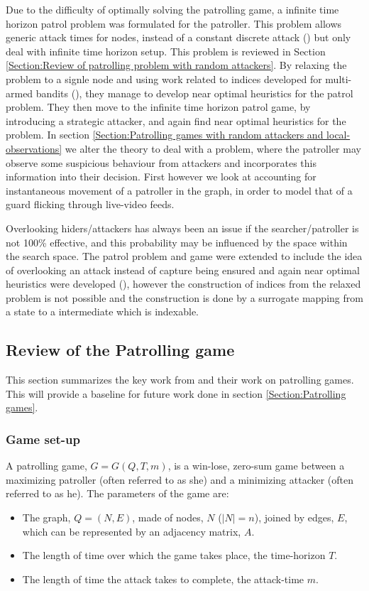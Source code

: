 \documentclass[a4paper,10pt]{article}
\theoremstyle{definition}
\theoremstyle{definition}
\theoremstyle{remark}
\theoremstyle{definition}
\begin{document}
Due to the difficulty of optimally solving the patrolling game, a infinite time horizon patrol problem was formulated for the patroller. This problem allows generic attack times for nodes, instead of a constant discrete attack (\citep{Lin2013}) but only deal with infinite time horizon setup. This problem is reviewed in Section \ref{Section:Review of patrolling problem with random attackers}. By relaxing the problem to a signle node and using work related to indices developed for multi-armed bandits (\cite{Gittins2011}), they manage to develop near optimal heuristics for the patrol problem. They then move to the infinite time horizon patrol game, by introducing a strategic attacker, and again find near optimal heuristics for the problem. In section \ref{Section:Patrolling games with random attackers and local-observations} we alter the theory to deal with a problem, where the patroller may observe some suspicious behaviour from attackers and incorporates this information into their decision. First however we look at accounting for instantaneous movement of a patroller in the graph, in order to model that of a guard flicking through live-video feeds.

Overlooking hiders/attackers has always been an issue if the searcher/patroller is not 100\% effective, and this probability may be influenced by the space within the search space. The patrol problem and game were extended to include the idea of overlooking an attack instead of capture being ensured and again near optimal heuristics were developed (\cite{Lin2014}), however the construction of indices from the relaxed problem is not possible and the construction is done by a surrogate mapping from a state to a intermediate which is indexable.

\subsection{Review of the Patrolling game}
\label{Section:Review of Strategic Patrolling games}
This section summarizes the key work from \cite{Alpern2011} and their work on patrolling games. This will provide a baseline for future work done in section \ref{Section:Patrolling games}.

\subsubsection{Game set-up}
A patrolling game, $G=G(Q,T,m)$, is a win-lose, zero-sum game between a maximizing patroller (often referred to as she) and a minimizing attacker (often referred to as he). The parameters of the game are:
\begin{itemize}
\item The graph, $Q=(N,E)$,   made of nodes, $N$ ($|N|=n$), joined by edges, $E$, which can be represented by an adjacency matrix, $A$.
\item The length of time over which the game takes place, the time-horizon $T$.
\item The length of time the attack takes to complete, the attack-time $m$.
\end{itemize}
\end{document}

